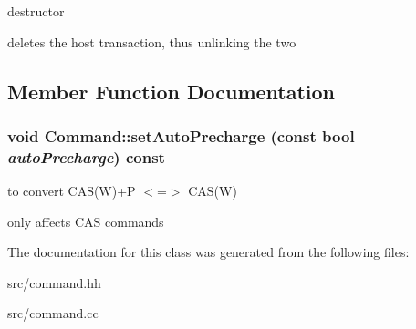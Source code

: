 destructor 

deletes the host transaction, thus unlinking the two 

\subsection{Member Function Documentation}
\subsubsection[{setAutoPrecharge}]{\setlength{\rightskip}{0pt plus 5cm}void Command::setAutoPrecharge (const bool {\em autoPrecharge}) const}\label{class_d_r_a_msim_i_i_1_1_command_ae1df06fd9d7d4a40113ba76d37196575}


to convert CAS(W)+P $<$=$>$ CAS(W) 

only affects CAS commands 

The documentation for this class was generated from the following files:\begin{DoxyCompactItemize}
\item 
src/command.hh\item 
src/command.cc\end{DoxyCompactItemize}
